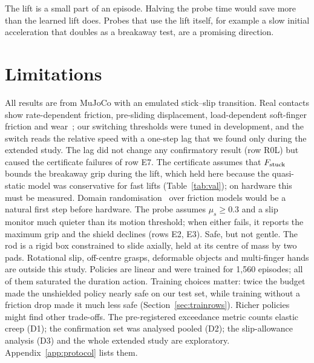  The lift is a small part of an episode. Halving the probe time would save more than the
learned lift does. Probes that use the lift itself, for example a slow initial acceleration that doubles as a breakaway test,
are a promising direction.

\section{Limitations}\label{sec:lim}
 All results are from MuJoCo with an emulated stick--slip transition. Real contacts show
rate-dependent friction, pre-sliding displacement, load-dependent soft-finger friction and wear~\cite{canudas1995,xydas1999};
our switching thresholds were tuned in development, and the switch reads the relative speed with a one-step lag that we
found only during the extended study. The lag did not change any confirmatory result (row R0L) but caused the
certificate failures of row E7. The certificate assumes that $F_{\mathrm{stuck}}$ bounds the breakaway grip during the
lift, which held here because the quasi-static model was conservative for fast lifts (Table~\ref{tab:val}); on hardware this
must be measured. Domain randomisation~\cite{tobin2017,peng2018} over friction models would be a natural first step before
hardware.
 The probe assumes $\mu_s\ge0.3$ and a slip monitor much quieter than its motion
threshold; when either fails, it reports the maximum grip and the shield declines (rows E2, E3). Safe, but not gentle.
 The rod is a rigid box constrained to slide axially, held at its centre of mass by two pads. Rotational
slip, off-centre grasps, deformable objects and multi-finger hands are outside this study.
 Policies are linear and were trained for 1{,}560 episodes; all of them saturated the duration
action. Training choices matter: twice the budget made the unshielded policy nearly safe on our test set, while training
without a friction drop made it much less safe (Section~\ref{sec:trainrows}). Richer policies might find other trade-offs.
 The pre-registered exceedance metric counts elastic creep (D1); the confirmation set was analysed
pooled (D2); the slip-allowance analysis (D3) and the whole extended study are exploratory. Appendix~\ref{app:protocol} lists
them.

